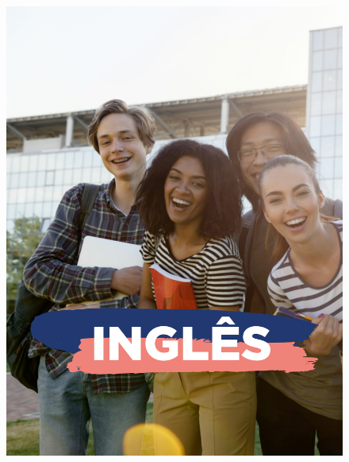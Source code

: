 \begin{figure}[htpb]
\vspace*{-2.5cm}
\hspace*{-2.5cm}\includegraphics[height=\paperheight]{../separadores/separadorING9A.png}
\end{figure}
\pagebreak
